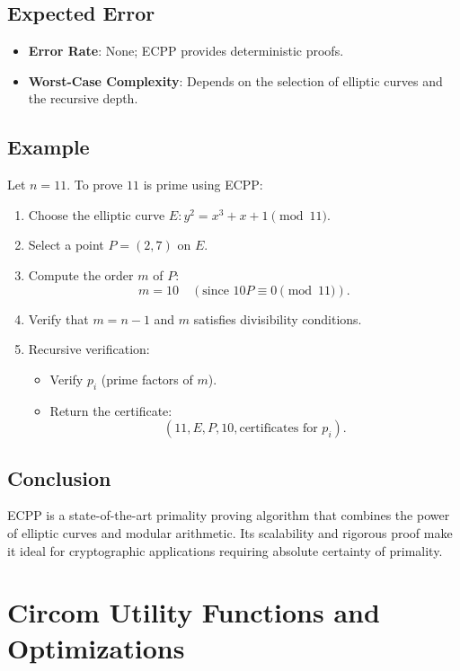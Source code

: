 \documentclass[12pt]{article}
\begin{document}
\subsection*{Expected Error}

\begin{itemize}
    \item \textbf{Error Rate}: None; ECPP provides deterministic proofs.
    \item \textbf{Worst-Case Complexity}: Depends on the selection of elliptic curves and the recursive depth.
\end{itemize}

\subsection*{Example}

Let \( n = 11 \). To prove \( 11 \) is prime using ECPP:

\begin{enumerate}
    \item Choose the elliptic curve \( E: y^2 = x^3 + x + 1 \pmod{11} \).
    \item Select a point \( P = (2, 7) \) on \( E \).
    \item Compute the order \( m \) of \( P \):
    \[
    m = 10 \quad (\text{since } 10P \equiv 0 \pmod{11}).
    \]
    \item Verify that \( m = n - 1 \) and \( m \) satisfies divisibility conditions.
    \item Recursive verification:
    \begin{itemize}
        \item Verify \( p_i \) (prime factors of \( m \)).
        \item Return the certificate:
        \[
        (11, E, P, 10, \text{certificates for } p_i).
        \]
    \end{itemize}
\end{enumerate}

\subsection*{Conclusion}

ECPP is a state-of-the-art primality proving algorithm that combines the power of elliptic curves and modular arithmetic. Its scalability and rigorous proof make it ideal for cryptographic applications requiring absolute certainty of primality.


\section{Circom Utility Functions and Optimizations}
\end{document}
